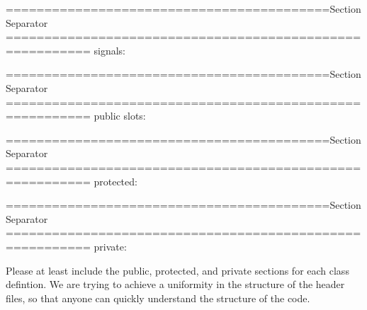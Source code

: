 ==========================================Section Separator ========================================================= signals\-:

==========================================Section Separator ========================================================= public slots\-:

==========================================Section Separator ========================================================= protected\-:

==========================================Section Separator ========================================================= private\-:

Please at least include the public, protected, and private sections for each class defintion. We are trying to achieve a uniformity in the structure of the header files, so that anyone can quickly understand the structure of the code.


